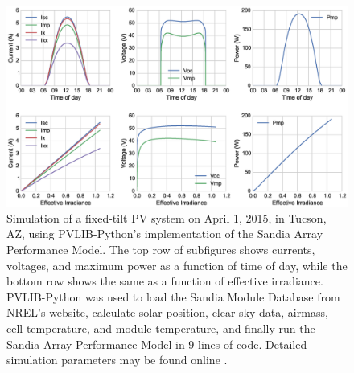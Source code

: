 \documentclass[conference]{IEEEtran}
\newcommand{\holmgren}[1]{{\bf\color{red} WH: #1}}
\begin{document}
\begin{figure}
\centering
\includegraphics[width=\textwidth]{fixed_sapm.eps}
\caption{\label{sapm}Simulation of a fixed-tilt PV system on April 1, 2015, in Tucson, AZ, using PVLIB-Python's implementation of the Sandia Array Performance Model. The top row of subfigures shows currents, voltages, and maximum power as a function of time of day, while the bottom row shows the same as a function of effective irradiance. PVLIB-Python was used to load the Sandia Module Database from NREL's website, calculate solar position, clear sky data, airmass, cell temperature, and module temperature, and finally run the Sandia Array Performance Model in 9 lines of code. Detailed simulation parameters may be found online \cite{pvlib-pvsc2015-github}.}
\end{figure}

\end{document}
